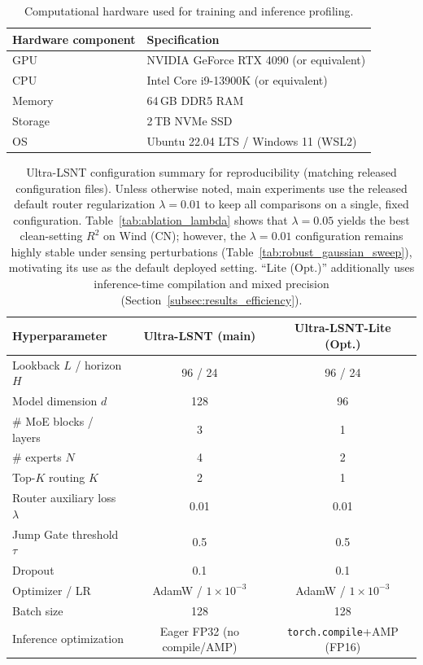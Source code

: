 \documentclass[review,3p,times]{elsarticle}
\begin{document}
\begin{table}[t]
\centering
\caption{Computational hardware used for training and inference profiling.}
\label{tab:impl_hardware}
\begin{tabular}{ll}
\toprule
Hardware component & Specification \\
\midrule
GPU & NVIDIA GeForce RTX 4090 (or equivalent) \\
CPU & Intel Core i9-13900K (or equivalent) \\
Memory & 64\,GB DDR5 RAM \\
Storage & 2\,TB NVMe SSD \\
OS & Ubuntu 22.04 LTS / Windows 11 (WSL2) \\
\bottomrule
\end{tabular}
\end{table}
\begin{table}[t]
\centering
\caption{Ultra-LSNT configuration summary for reproducibility (matching released configuration files). Unless otherwise noted, main experiments use the released default router regularization $\lambda=0.01$ to keep all comparisons on a single, fixed configuration. Table~\ref{tab:ablation_lambda} shows that $\lambda=0.05$ yields the best clean-setting $R^2$ on Wind (CN); however, the $\lambda=0.01$ configuration remains highly stable under sensing perturbations (Table~\ref{tab:robust_gaussian_sweep}), motivating its use as the default deployed setting. ``Lite (Opt.)'' additionally uses inference-time compilation and mixed precision (Section~\ref{subsec:results_efficiency}).}
\label{tab:model_config}
\begin{tabular}{lcc}
\toprule
Hyperparameter & Ultra-LSNT (main) & Ultra-LSNT-Lite (Opt.) \\
\midrule
Lookback $L$ / horizon $H$ & 96 / 24 & 96 / 24 \\
Model dimension $d$ & 128 & 96 \\
\# MoE blocks / layers & 3 & 1 \\
\# experts $N$ & 4 & 2 \\
Top-$K$ routing $K$ & 2 & 1 \\
Router auxiliary loss $\lambda$ & 0.01 & 0.01 \\
Jump Gate threshold $\tau$ & 0.5 & 0.5 \\
Dropout & 0.1 & 0.1 \\
Optimizer / LR & AdamW / $1\times10^{-3}$ & AdamW / $1\times10^{-3}$ \\
Batch size & 128 & 128 \\
Inference optimization & Eager FP32 (no compile/AMP) & \texttt{torch.compile}+AMP (FP16) \\
\bottomrule
\end{tabular}
\end{table}
\end{document}
